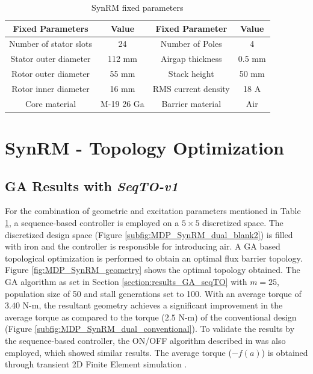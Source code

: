 \begin{table}[h!]
\centering
\begin{tabular}{|c|c|c|c|}
\hline
\textbf{Fixed Parameters} & \textbf{Value} & \textbf{Fixed Parameter} & \textbf{Value} \\ \hline \hline
Number of stator slots    & 24             & Number of Poles          & 4              \\ \hline
Stator outer diameter     & 112 mm         & Airgap thickness         & 0.5 mm         \\ \hline
Rotor outer diameter      & 55 mm          & Stack height             & 50 mm          \\ \hline
Rotor inner diameter      & 16 mm          & RMS current density      & 18 A           \\ \hline
Core material             & M-19 26 Ga     & Barrier material         & Air            \\ \hline
\end{tabular}%
\caption{SynRM fixed parameters}
\label{tab:MDP_synRM_fixed_parameters}
\end{table}

\section{SynRM - Topology Optimization}
\label{sec:MDP_SynRM_TO_results}

\subsection{GA Results with \textit{SeqTO-v1}}

For the combination of geometric and excitation parameters mentioned in Table \ref{tab:MDP_synRM_fixed_parameters}, a sequence-based controller is employed on a $5 \times 5$ discretized space. The discretized design space (Figure \ref{subfig:MDP_SynRM_dual_blank2}) is filled with iron and the controller is responsible for introducing air. A GA based topological optimization is performed to obtain an optimal flux barrier topology. Figure \ref{fig:MDP_SynRM_geometry} shows the optimal topology obtained. 
The GA algorithm as set in Section \ref{section:results_GA_seqTO} with $m=25$, population size of 50 and stall generations set to 100. With an average torque of $3.40$ N-m, the resultant geometry achieves a significant improvement in the average torque as compared to the torque ($2.5$ N-m) of the conventional design (Figure \ref{subfig:MDP_SynRM_dual_conventional}). To validate the results by the sequence-based controller, the ON/OFF algorithm described in \cite{midha2019selection} was also employed, which showed similar results. The average torque ($-f(a)$) is obtained through transient 2D Finite Element simulation \parencite{Magnet}. 

